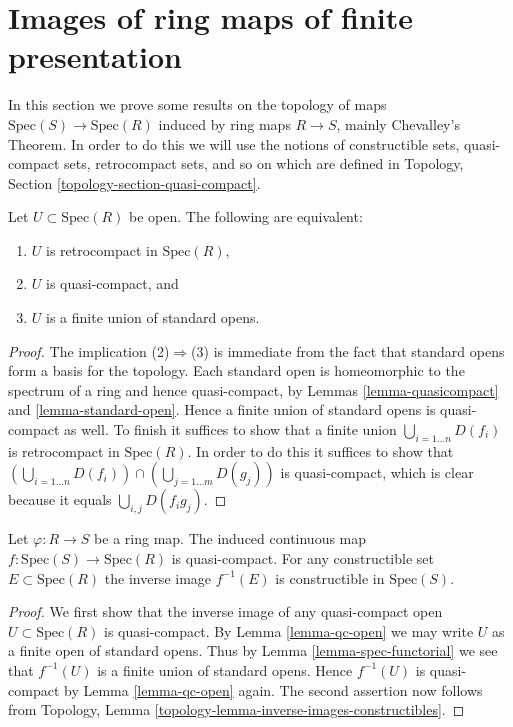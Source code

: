 \section{Images of ring maps of finite presentation}
\label{section-images-finite-presentation}

\noindent
In this section we prove some results on the
topology of maps $\text{Spec}(S) \to \text{Spec}(R)$
induced by ring maps $R \to S$, mainly Chevalley's Theorem.
In order to do this we will use the notions of constructible sets,
quasi-compact sets, retrocompact sets, and so on
which are defined in Topology, Section \ref{topology-section-quasi-compact}.

\begin{lemma}
\label{lemma-qc-open}
Let $U \subset \text{Spec}(R)$ be open. The following
are equivalent:
\begin{enumerate}
\item $U$ is retrocompact in $\text{Spec}(R)$,
\item $U$ is quasi-compact, and
\item $U$ is a finite union of standard opens.
\end{enumerate}
\end{lemma}

\begin{proof}
The implication (2)$\Rightarrow$(3) is immediate from the fact that standard
opens form a basis for the topology. Each standard open is
homeomorphic to the spectrum of a ring and hence quasi-compact,
by Lemmas \ref{lemma-quasicompact} and \ref{lemma-standard-open}.
Hence a finite union of standard opens is quasi-compact as well.
To finish it suffices to show that a finite union
$\bigcup_{i = 1\ldots n} D(f_i)$ is retrocompact in $\text{Spec}(R)$.
In order to do this it suffices to show that
$(\bigcup_{i = 1\ldots n} D(f_i)) \cap (\bigcup_{j = 1\ldots m} D(g_j))$
is quasi-compact, which is clear because it equals
$\bigcup_{i, j} D(f_i g_j)$.
\end{proof}

\begin{lemma}
\label{lemma-affine-map-quasi-compact}
Let $\varphi : R \to S$ be a ring map.
The induced continuous map $f : \text{Spec}(S) \to \text{Spec}(R)$
is quasi-compact. For any constructible set $E \subset \text{Spec}(R)$
the inverse image $f^{-1}(E)$ is constructible in $\text{Spec}(S)$.
\end{lemma}

\begin{proof}
We first show that the inverse image of any quasi-compact
open $U \subset \text{Spec}(R)$ is quasi-compact. By
Lemma \ref{lemma-qc-open} we may write $U$ as a finite
open of standard opens. Thus by Lemma \ref{lemma-spec-functorial}
we see that $f^{-1}(U)$ is a finite union of standard opens.
Hence $f^{-1}(U)$ is quasi-compact by Lemma \ref{lemma-qc-open} again.
The second assertion now follows from Topology, Lemma
\ref{topology-lemma-inverse-images-constructibles}.
\end{proof}

